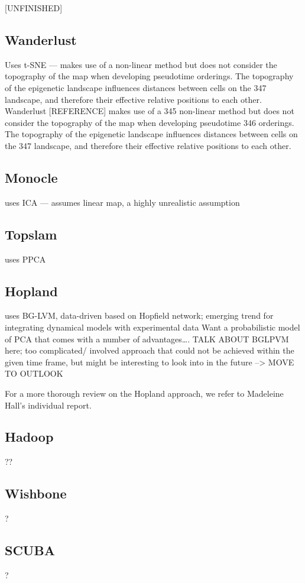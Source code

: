\documentclass[journal, a4paper]{IEEEtran}
\begin{document}
[UNFINISHED]

\subsection{Wanderlust}
Uses t-SNE — makes use of a non-linear method but does not consider the topography of the map when developing pseudotime orderings. The topography of the epigenetic landscape influences distances between cells on the 347 landscape, and therefore their effective relative positions to each other. 
Wanderlust [REFERENCE] makes use of a 345 non-linear method but does not consider the topography of the map when developing pseudotime 346 orderings. The topography of the epigenetic landscape influences distances between cells on the 347 landscape, and therefore their effective relative positions to each other. 

\subsection{Monocle}
uses ICA — assumes linear map, a highly unrealistic assumption

\subsection{Topslam}
uses PPCA

\subsection{Hopland}
uses BG-LVM, data-driven based on Hopfield network; emerging trend for integrating dynamical models with experimental data
Want a probabilistic model of PCA that comes with a number of advantages….
TALK ABOUT BGLPVM here; too complicated/ involved approach that could not be achieved within the given time frame, but might be interesting to look into in the future --> MOVE TO OUTLOOK

For a more thorough review on the Hopland approach, we refer to Madeleine Hall's individual report.
\subsection{Hadoop}??
\subsection{Wishbone}?
\subsection{SCUBA}?
\end{document}
